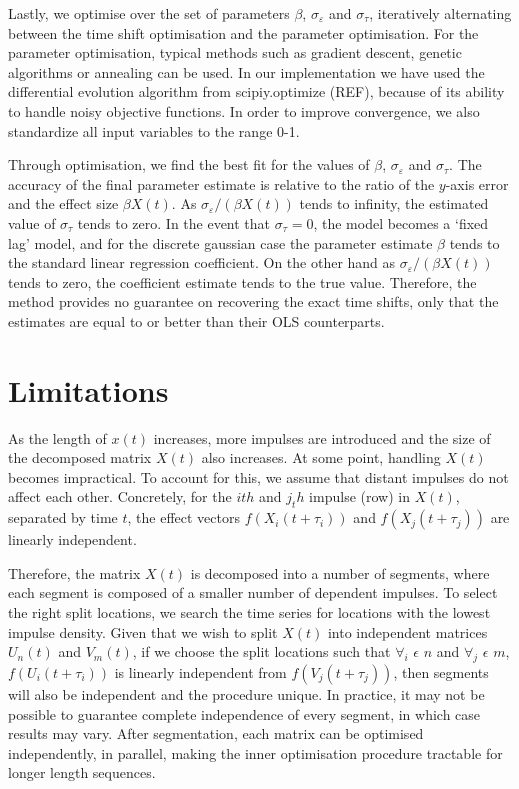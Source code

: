 \documentclass[11pt]{amsart}
\begin{document}
Lastly, we optimise over the set of parameters $\beta$, $\sigma_{\varepsilon}$ and $\sigma_{\tau}$, iteratively alternating between the time shift optimisation and the parameter optimisation. For the parameter optimisation, typical methods such as gradient descent, genetic algorithms or annealing can be used.  In our implementation we have used the differential evolution algorithm from scipiy.optimize (REF), because of its ability to handle noisy objective functions. In order to improve convergence, we also standardize all input variables to the range 0-1.

Through optimisation, we find the best fit for the values of $\beta$, $\sigma_{\varepsilon}$ and $\sigma_{\tau}$. The accuracy of the final parameter estimate is relative to the ratio of the $y$-axis error and the effect size $\beta X(t)$. As $\sigma_{\varepsilon}/(\beta X(t))$ tends to infinity, the estimated value of $\sigma_{\tau}$ tends to zero. In the event that $\sigma_{\tau}=0$, the model becomes a ‘fixed lag’ model, and for the discrete gaussian case the parameter estimate $\beta$ tends to the standard linear regression coefficient.
On the other hand as $\sigma_{\varepsilon}/(\beta X(t))$ tends to zero, the coefficient estimate tends to the true value. Therefore, the method provides no guarantee on recovering the exact time shifts, only that the estimates are equal to or better than their OLS counterparts.

\section{Limitations}
As the length of $x(t)$ increases, more impulses are introduced and the size of the decomposed matrix $X(t)$ also increases. At some point, handling $X(t)$ becomes impractical. To account for this, we assume that distant impulses do not affect each other. Concretely, for the $ith$ and $j_th$ impulse (row) in $X(t)$, separated by time $t$, the effect vectors $f(X_i(t + \tau_i))$ and $f(X_j(t + \tau_j))$ are linearly independent.

Therefore, the matrix $X(t)$ is decomposed into a number of segments, where each segment is 
composed of a smaller number of dependent impulses. To select the right split locations, we search the time series for locations with the lowest impulse density. Given that we wish to split $X(t)$ into independent matrices $U_n(t)$ and $V_m(t)$, 
if we choose the split locations such that $\forall_i$ $\epsilon$ $n$ and  $\forall_j$ $\epsilon$ $m$, 
$f(U_i(t + \tau_i))$ is linearly independent from $f(V_j(t + \tau_j))$, 
then segments will also be independent and the procedure unique. 
In practice, it may not be possible to guarantee complete independence of every segment, 
in which case results may vary. After segmentation, each matrix can be optimised independently, 
in parallel, making the inner optimisation procedure tractable for longer length sequences. 
\end{document}
